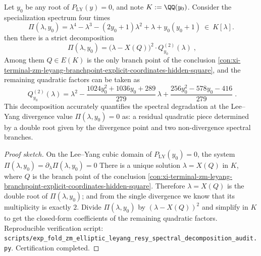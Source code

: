 \begin{conclusion}\label{con:xi-terminal-zm-leyang-branch-spectral-quartic-double-root-factorization}
Let \(y_0\) be any root of \(P_{\mathrm{LY}}(y)=0\), and note \(K:=\QQ(y_0)\).
Consider the specialization spectrum four times
\[
\Pi(\lambda,y_0)
=\lambda^{4}-\lambda^{3}-(2y_0+1)\lambda^{2}+\lambda+y_0(y_0+1)\ \in\ K[\lambda].
\]
then there is a strict decomposition
\[
\boxed{\;
\Pi(\lambda,y_0)=\bigl(\lambda-X(Q)\bigr)^{2}\cdot Q_{y_0}^{(2)}(\lambda)\; },
\]
Among them \(Q\in E(K)\) is the only branch point of the conclusion \ref{con:xi-terminal-zm-leyang-branchpoint-explicit-coordinates-hidden-square}, and the remaining quadratic factors can be taken as
\[
\boxed{\;
Q_{y_0}^{(2)}(\lambda)=\lambda^{2}
-\frac{1024y_0^{2}+1036y_0+289}{279}\,\lambda
+\frac{256y_0^{2}-578y_0-416}{279}\; }.
\]
This decomposition accurately quantifies the spectral degradation at the Lee--Yang divergence value \(\Pi(\lambda,y_0)=0\) as: a residual quadratic piece determined by a double root given by the divergence point and two non-divergence spectral branches.
\end{conclusion}
\begin{proof}[Proof sketch]
On the Lee--Yang cubic domain of \(P_{\mathrm{LY}}(y_0)=0\), the system
\(
\Pi(\lambda,y_0)=\partial_{\lambda}\Pi(\lambda,y_0)=0
\)
There is a unique solution \(\lambda=X(Q)\) in \(K\), where \(Q\) is the branch point of the conclusion \ref{con:xi-terminal-zm-leyang-branchpoint-explicit-coordinates-hidden-square}.
Therefore \(\lambda=X(Q)\) is the double root of \(\Pi(\lambda,y_0)\); and from the single divergence we know that its multiplicity is exactly \(2\).
Divide \(\Pi(\lambda,y_0)\) by \((\lambda-X(Q))^{2}\) and simplify in \(K\) to get the closed-form coefficients of the remaining quadratic factors.
Reproducible verification script: \texttt{scripts/exp\_fold\_zm\_elliptic\_leyang\_resy\_spectral\_decomposition\_audit.py}. Certification completed.
\end{proof}

